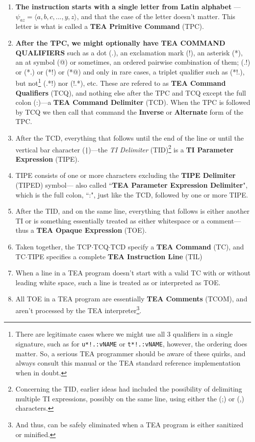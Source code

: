 \documentclass[a4paper, 18pt]{book} %
\begin{document}
\begin{enumerate}
\item \textbf{The instruction starts with a single letter from Latin alphabet} --- $\psi_{az} = \langle a, b, c, ..., y, z \rangle$, and that the case of the letter doesn't matter. This letter is what is called a \textbf{TEA Primitive Command} (TPC).
\item \textbf{After the TPC, we might optionally have TEA COMMAND QUALIFIERS} such as a dot (.), an exclamation mark (!), an asterisk (*), an at symbol (@) or sometimes, an ordered pairwise combination of them; (.!) or (*.) or (*!) or (*@) and only in rare cases, a triplet qualifier such as (*!.), but not\footnote{There are legitimate cases where we might use all 3 qualifiers in a single signature, such as for \texttt{u*!.:vNAME} or \texttt{t*!.:vNAME}, however, the ordering does matter. So, a serious TEA programmer should be aware of these quirks, and always consult this manual or the TEA standard reference implementation\cite{cli_tttt} when in doubt.} (.*!) nor (!.*), etc. These are refered to as \textbf{TEA Command Qualifiers} (TCQ), and nothing else after the TPC and TCQ except the full colon (:)---a \textbf{TEA Command Delimiter} (TCD). When the TPC is followed by TCQ we then call that command the \textbf{Inverse} or \textbf{Alternate} form of the TPC.
\item After the TCD, everything that follows until the end of the line or until the vertical bar character (\verb!|!)---the \textit{TI Delimiter} (TID)\footnote{Concerning the TID, earlier ideas had included the possibility of delimiting multiple TI expressions, possibly on the same line, using either the (;) or (,) characters.} is a \textbf{TI Parameter Expression} (TIPE).
\item TIPE consists of one or more characters excluding the \textbf{TIPE Delimiter} (TIPED) symbol--- also called ``\textbf{TEA Parameter Expression Delimiter}", which is the full colon, ``:", just like the TCD, followed by one or more TIPE.
\item After the TID, and on the same line, everything that follows is either another TI or is something essentially treated as either whitespace or a comment---thus a \textbf{TEA Opaque Expression} (TOE).
\item Taken together, the TCP$\cdot$TCQ$\cdot$TCD specify a \textbf{TEA Command} (TC), and TC$\cdot$TIPE specifies a complete \textbf{TEA Instruction Line} (TIL)
\item When a line in a TEA program doesn't start with a valid TC with or without leading white space, such a line is treated as or interpreted as TOE.
\item All TOE in a TEA program are essentially \textbf{TEA Comments} (TCOM), and aren't processed by the TEA interpreter\footnote{And thus, can be safely eliminated when a TEA program is either sanitized or minified.}.
\end{enumerate}
\end{document}
